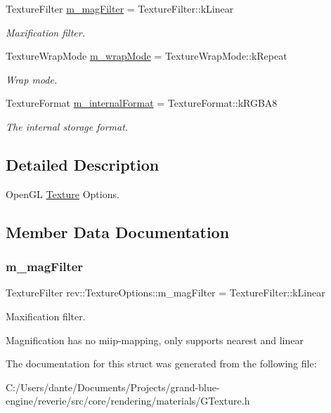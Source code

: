 \begin{DoxyCompactItemize}
Texture\+Filter \mbox{\hyperlink{structrev_1_1_texture_options_abf005c6cf9c1c1181579707e8f0284b4}{m\+\_\+mag\+Filter}} = Texture\+Filter\+::k\+Linear
\begin{DoxyCompactList}\small\item\em Maxification filter. \end{DoxyCompactList}\item 
\mbox{\label{structrev_1_1_texture_options_aaaea4e278d9de670feac318c46175470}} 
Texture\+Wrap\+Mode \mbox{\hyperlink{structrev_1_1_texture_options_aaaea4e278d9de670feac318c46175470}{m\+\_\+wrap\+Mode}} = Texture\+Wrap\+Mode\+::k\+Repeat
\begin{DoxyCompactList}\small\item\em Wrap mode. \end{DoxyCompactList}\item 
\mbox{\label{structrev_1_1_texture_options_a5bea775d320bae08ed71a90b0973a947}} 
Texture\+Format \mbox{\hyperlink{structrev_1_1_texture_options_a5bea775d320bae08ed71a90b0973a947}{m\+\_\+internal\+Format}} = Texture\+Format\+::k\+R\+G\+B\+A8
\begin{DoxyCompactList}\small\item\em The internal storage format. \end{DoxyCompactList}\end{DoxyCompactItemize}


\subsection{Detailed Description}
Open\+GL \mbox{\hyperlink{classrev_1_1_texture}{Texture}} Options. 

\subsection{Member Data Documentation}
\mbox{\label{structrev_1_1_texture_options_abf005c6cf9c1c1181579707e8f0284b4}} 
\subsubsection{\texorpdfstring{m\_magFilter}{m\_magFilter}}
{\footnotesize\ttfamily Texture\+Filter rev\+::\+Texture\+Options\+::m\+\_\+mag\+Filter = Texture\+Filter\+::k\+Linear}



Maxification filter. 

Magnification has no miip-\/mapping, only supports nearest and linear 

The documentation for this struct was generated from the following file\+:\begin{DoxyCompactItemize}
\item 
C\+:/\+Users/dante/\+Documents/\+Projects/grand-\/blue-\/engine/reverie/src/core/rendering/materials/G\+Texture.\+h\end{DoxyCompactItemize}
